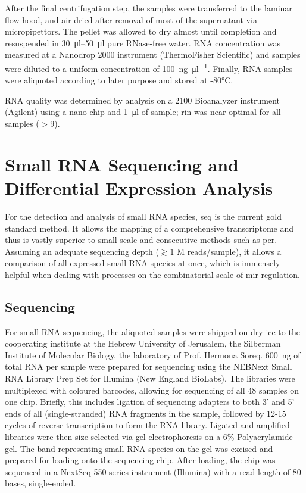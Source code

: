 After the final centrifugation step, the samples were transferred to the laminar flow hood, and air dried after removal of most of the supernatant via micropipettors. The pellet was allowed to dry almost until completion and resuspended in \SIrange{30}{50}{\micro\litre} pure RNase-free water. RNA concentration was measured at a Nanodrop 2000 instrument (ThermoFisher Scientific) and samples were diluted to a uniform concentration of \SI{100}{\nano\gram\per\micro\litre}. Finally, RNA samples were aliquoted according to later purpose and stored at -80°C.

RNA quality was determined by analysis on a 2100 Bioanalyzer instrument (Agilent) using a nano chip and \SI{1}{\micro\litre} of sample; \ac{rin} was near optimal for all samples ($> 9$).

\section{Small RNA Sequencing and Differential Expression Analysis}
For the detection and analysis of small RNA species, \ac{seq} is the current gold standard method. It allows the mapping of a comprehensive transcriptome and thus is vastly superior to small scale and consecutive methods such as \ac{pcr}. Assuming an adequate sequencing depth ($\gtrsim 1$ M reads/sample), it allows a comparison of all expressed small RNA species at once, which is immensely helpful when dealing with processes on the combinatorial scale of \ac{mir} regulation.

\subsection{Sequencing}
For small RNA sequencing, the aliquoted samples were shipped on dry ice to the cooperating institute at the Hebrew University of Jerusalem, the Silberman Institute of Molecular Biology, the laboratory of Prof. Hermona Soreq. \SI{600}{\nano\gram} of total RNA per sample were prepared for sequencing using the NEBNext Small RNA Library Prep Set for Illumina (New England BioLabs). The libraries were multiplexed with coloured barcodes, allowing for sequencing of all 48 samples on one chip. Briefly, this includes ligation of sequencing adapters to both 3' and 5' ends of all (single-stranded) RNA fragments in the sample, followed by 12-15 cycles of reverse transcription to form the RNA library. Ligated and amplified libraries were then size selected via gel electrophoresis on a 6\% Polyacrylamide gel. The band representing small RNA species on the gel was excised and prepared for loading onto the sequencing chip. After loading, the chip was sequenced in a NextSeq 550 series instrument (Illumina) with a read length of 80 bases, single-ended.

